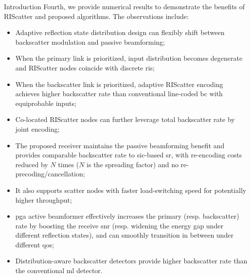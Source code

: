\begin{section}{Introduction}
	Fourth, we provide numerical results to demonstrate the benefits of RIScatter and proposed algorithms.
	The observations include:
	\begin{itemize}
		\item Adaptive reflection state distribution design can flexibly shift between backscatter modulation and passive beamforming;
		\item When the primary link is prioritized, input distribution becomes degenerate and RIScatter nodes coincide with discrete \gls{ris};
		\item When the backscatter link is prioritized, adaptive RIScatter encoding achieves higher backscatter rate than conventional line-coded \gls{bc} with equiprobable inputs;
		\item Co-located RIScatter nodes can further leverage total backscatter rate by joint encoding;
		\item The proposed receiver maintains the passive beamforming benefit and provides comparable backscatter rate to \gls{sic}-based \gls{sr}, with re-encoding costs reduced by $N$ times ($N$ is the spreading factor) and no re-precoding/cancellation;
		\item It also supports scatter nodes with faster load-switching speed for potentially higher throughput;
		\item \gls{pga} active beamformer effectively increases the primary (resp. backscatter) rate by boosting the receive \gls{snr} (resp. widening the energy gap under different reflection states), and can smoothly transition in between under different \gls{qos};
		\item Distribution-aware backscatter detectors provide higher backscatter rate than the conventional \gls{ml} detector.
	\end{itemize}
\end{section}


